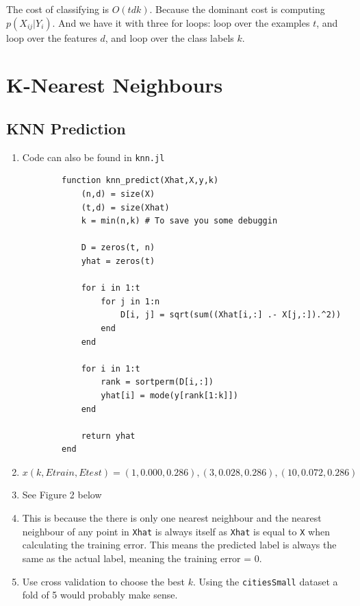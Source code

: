 \documentclass{article}
\begin{document}
The cost of classifying is $O(tdk)$. Because the dominant cost is computing $p(X_{ij} | Y_{i})$. And we have it with three for loops: loop over the examples $t$, and loop over the features $d$, and loop over the class labels $k$.


\section{K-Nearest Neighbours}

\subsection{KNN Prediction}

\begin{enumerate}
    \item Code can also be found in \texttt{knn.jl} \\
    \begin{verbatim}
        function knn_predict(Xhat,X,y,k)
            (n,d) = size(X)
            (t,d) = size(Xhat)
            k = min(n,k) # To save you some debuggin

            D = zeros(t, n)
            yhat = zeros(t)

            for i in 1:t
                for j in 1:n
                    D[i, j] = sqrt(sum((Xhat[i,:] .- X[j,:]).^2))
                end
            end

            for i in 1:t
                rank = sortperm(D[i,:])
                yhat[i] = mode(y[rank[1:k]])
            end

            return yhat
        end
    \end{verbatim}
	\item $x(k, Etrain, Etest) = (1, 0.000, 0.286), (3, 0.028, 0.286), (10, 0.072, 0.286)$
	\item See Figure 2 below
	\item This is because the there is only one nearest neighbour and the nearest neighbour of any point in \texttt{Xhat} is always itself as \texttt{Xhat} is equal to \texttt{X} when calculating the training error. This means the predicted label is always the same as the actual label, meaning the training error = 0.
	\item Use cross validation to choose the best $k$. Using the \texttt{citiesSmall} dataset a fold of 5 would probably make sense.
\end{enumerate}
\end{document}
